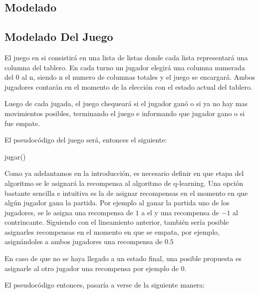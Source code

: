 \subsection{Modelado}

\subsection{Modelado Del Juego}

El juego en si consistirá en una lista de listas donde cada lista representará una columna del tablero. En cada turno un jugador elegirá una columna numerada del 0 al n, siendo n el numero de columnas totales y el juego se encargará. Ambos jugadores contarán en el momento de la elección con el estado actual del tablero.

Luego de cada jugada, el juego chequeará si el jugador ganó o si ya no hay mas movimientos posibles, terminando el juego e informando que jugador gano o si fue empate.

El pseudocódigo del juego será, entonces el siguiente:

\begin{algorithm}[h!]
\begin{algorithmic}[1]\parskip=1mm
 \caption{jugar()}
\end{algorithmic}
\end{algorithm}

Como ya adelantamos en la introducción, es necesario definir en que etapa del algoritmo se le asignará la recompensa al algoritmo de q-learning. Una opción bastante sencilla e intuitiva es la de asignar recompensas en el momento en que algún jugador gana la partida. Por ejemplo al ganar la partida uno de los jugadores, se le asigna una recompensa de $1$ a el y una recompensa de $-1$ al contrincante. Siguiendo con el lineamiento anterior, también sería posible asignarles recompensas en el momento en que se empata, por ejemplo, asignándoles a ambos jugadores una recompensa de $0.5$

En caso de que no se haya llegado a un estado final, una posible propuesta es asignarle al otro jugador una recompensa por ejemplo de 0.

El pseudocódigo entonces, pasaría a verse de la siguiente manera:

